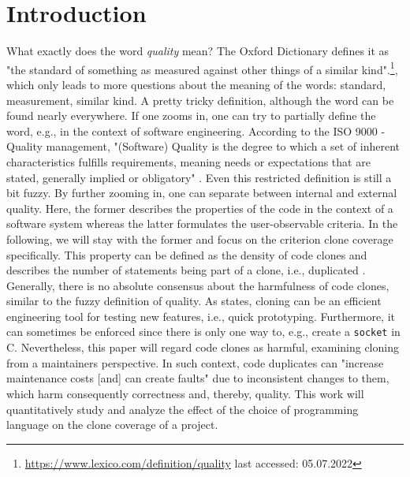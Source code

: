 
\section{Introduction}
\label{sec:intro}

What exactly does the word \textit{quality} mean? The Oxford Dictionary defines it as "the standard of something as measured against other things of a similar kind".\footnote{\url{https://www.lexico.com/definition/quality} last accessed: 05.07.2022}, which only leads to more questions about the meaning of the words: standard, measurement, similar kind. A pretty tricky definition, although the word can be found nearly everywhere.
If one zooms in, one can try to partially define the word, e.g., in the context of software engineering. According to the ISO 9000 - Quality management, "(Software) Quality is the degree to which a set of inherent characteristics fulfills requirements, meaning needs or expectations that are stated, generally implied or obligatory" \cite{matthes2020ase}.
Even this restricted definition is still a bit fuzzy. By further zooming in, one can separate between internal and external quality. Here, the former describes the properties of the code in the context of a software system \cite{pretschner2022requirements} whereas the latter formulates the user-observable criteria.
In the following, we will stay with the former and focus on the criterion clone coverage specifically.
This property can be defined as the density of code clones and describes the number of statements being part of a clone, i.e., duplicated \cite{knilling2020priorisierung}.
Generally, there is no absolute consensus about the harmfulness of code clones, similar to the fuzzy definition of quality. As \cite{kasper2006cloning} states, cloning can be an efficient engineering tool for testing new features, i.e., quick prototyping. Furthermore, it can sometimes be enforced since there is only one way to, e.g., create a \texttt{socket} in C.
Nevertheless, this paper will regard code clones as harmful, examining cloning from a maintainers perspective. In such context, code duplicates can "increase maintenance costs [and] can create faults" \cite{juergens2009code} due to inconsistent changes to them, which harm consequently correctness and, thereby, quality.
This work will quantitatively study and analyze the effect of the choice of programming language on the clone coverage of a project.